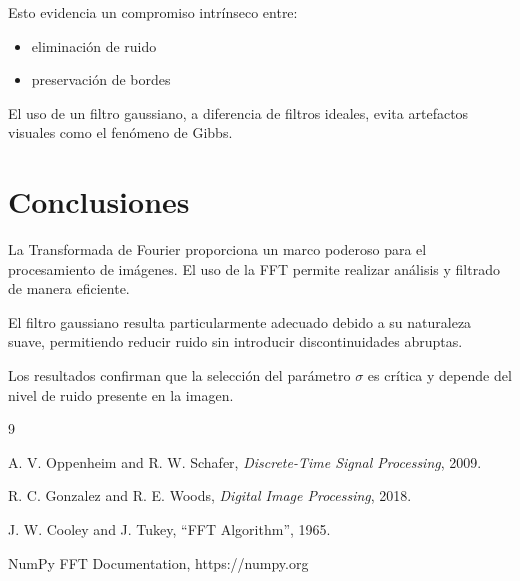 \documentclass[conference]{IEEEtran}
\begin{document}
	Esto evidencia un compromiso intrínseco entre:
	
	\begin{itemize}
		\item eliminación de ruido
		\item preservación de bordes
	\end{itemize}
	
	El uso de un filtro gaussiano, a diferencia de filtros ideales, evita artefactos visuales como el fenómeno de Gibbs.
	
	\section{Conclusiones}
	
	La Transformada de Fourier proporciona un marco poderoso para el procesamiento de imágenes. El uso de la FFT permite realizar análisis y filtrado de manera eficiente.
	
	El filtro gaussiano resulta particularmente adecuado debido a su naturaleza suave, permitiendo reducir ruido sin introducir discontinuidades abruptas.
	
	Los resultados confirman que la selección del parámetro $\sigma$ es crítica y depende del nivel de ruido presente en la imagen.
	
	\begin{thebibliography}{9}
		
		A. V. Oppenheim and R. W. Schafer,
		\textit{Discrete-Time Signal Processing}, 2009.
		
		R. C. Gonzalez and R. E. Woods,
		\textit{Digital Image Processing}, 2018.
		
		J. W. Cooley and J. Tukey,
		``FFT Algorithm'', 1965.
		
		NumPy FFT Documentation,
		https://numpy.org
		
	\end{thebibliography}
	
\end{document}

